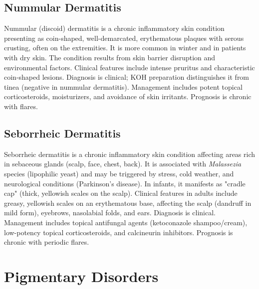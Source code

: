 \subsection{Nummular Dermatitis}
\label{sec:Nummular Dermatitis}
Nummular (discoid) dermatitis is a chronic inflammatory skin condition presenting as coin-shaped, well-demarcated, erythematous plaques with serous crusting, often on the extremities. It is more common in winter and in patients with dry skin. The condition results from skin barrier disruption and environmental factors. Clinical features include intense pruritus and characteristic coin-shaped lesions. Diagnosis is clinical; KOH preparation distinguishes it from tinea (negative in nummular dermatitis). Management includes potent topical corticosteroids, moisturizers, and avoidance of skin irritants. Prognosis is chronic with flares.

\subsection{Seborrheic Dermatitis}
\label{sec:Seborrheic Dermatitis}
Seborrheic dermatitis is a chronic inflammatory skin condition affecting areas rich in sebaceous glands (scalp, face, chest, back). It is associated with \textit{Malassezia} species (lipophilic yeast) and may be triggered by stress, cold weather, and neurological conditions (Parkinson's disease). In infants, it manifests as "cradle cap" (thick, yellowish scales on the scalp). Clinical features in adults include greasy, yellowish scales on an erythematous base, affecting the scalp (dandruff in mild form), eyebrows, nasolabial folds, and ears. Diagnosis is clinical. Management includes topical antifungal agents (ketoconazole shampoo/cream), low-potency topical corticosteroids, and calcineurin inhibitors. Prognosis is chronic with periodic flares.

\section{Pigmentary Disorders}




